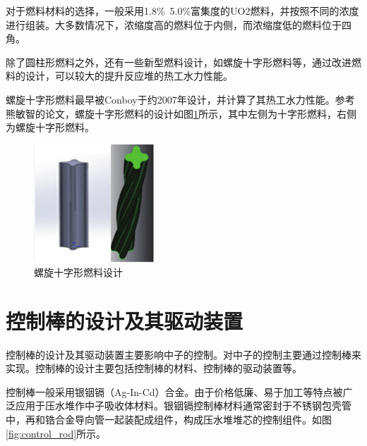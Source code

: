\documentclass{article}
\begin{document}
对于燃料材料的选择，一般采用1.8\%~5.0\%富集度的UO2燃料，并按照不同的浓度进行组装\cite{JiSongTaoXiaoXingFanYingDuiHuanXingRanLiaoZuJianSheJiJiYingYongYanJiu2023}。大多数情况下，浓缩度高的燃料位于内侧，而浓缩度低的燃料位于四角。\cite{LiuGuoMingHPR1000DuiXinZhuangZai50MOXZuJianDeRanLiaoGuanLiFangAn2017}\cite{muratResearchAP1000Fuel2021}

除了圆柱形燃料之外，还有一些新型燃料设计，如螺旋十字形燃料等，通过改进燃料的设计，可以较大的提升反应堆的热工水力性能。

螺旋十字形燃料最早被Conboy于约2007年设计\cite{conboyThermalHydraulicAnalysisCrossShaped}，并计算了其热工水力性能\cite{conboyEvaluationHelicalCruciformFuel2014}。参考熊敏智的论文，螺旋十字形燃料的设计如图\ref{fig:cross_shaped_fuel}所示\cite{XiongMinZhiJiYuMengTeQiaLuoJunYunHuaDeYiXingJiHeRanLiaoBangWuLiXingNengYanJiu2023}，其中左侧为十字形燃料，右侧为螺旋十字形燃料。

\begin{figure}[htbp]
    \centering
    \includegraphics[width=0.4\textwidth]{figures/XiongMinZhiJiYuMengTeQiaLuoJunYunHuaDeYiXingJiHeRanLiaoBangWuLiXingNengYanJiu2023.png}
    \caption{螺旋十字形燃料设计}
    \label{fig:cross_shaped_fuel}
\end{figure}

\section{控制棒的设计及其驱动装置}
控制棒的设计及其驱动装置主要影响中子的控制。对中子的控制主要通过控制棒来实现。控制棒的设计主要包括控制棒的材料、控制棒的驱动装置等。

控制棒一般采用银铟镉（Ag-In-Cd）合金。由于价格低廉、易于加工等特点被广泛应用于压水堆作中子吸收体材料。\cite{ChenHaoHeJiAgInCdHeJinBangCaiLiaoYanJiuJinZhan2019}银铟镉控制棒材料通常密封于不锈钢包壳管中，再和锆合金导向管一起装配成组件，构成压水堆堆芯的控制组件。如图\ref{fig:control_rod}所示。
\end{document}

